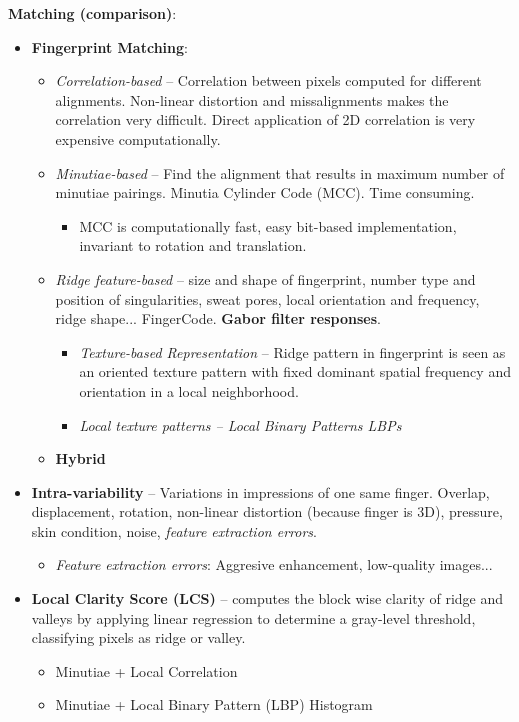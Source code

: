 \documentclass[a4paper]{article}
\begin{document}
      \textbf{Matching (comparison)}:
      \begin{itemize}
        \item \textbf{Fingerprint Matching}:
        \begin{itemize}
          \item \emph{Correlation-based} -- Correlation between pixels computed for different alignments. Non-linear distortion and missalignments makes the correlation very difficult. Direct application of 2D correlation is very expensive computationally.
          \item \emph{Minutiae-based} -- Find the alignment that results in maximum number of minutiae pairings. Minutia Cylinder Code (MCC). Time consuming.
          \begin{itemize}
            \item MCC is computationally fast, easy bit-based implementation, invariant to rotation and translation.
          \end{itemize}
          \item \emph{Ridge feature-based} -- size and shape of fingerprint, number type and position of singularities, sweat pores, local orientation and frequency, ridge shape... FingerCode. \textbf{Gabor filter responses}.
          \begin{itemize}
            \item \emph{Texture-based Representation} -- Ridge pattern in fingerprint is seen as an oriented texture pattern with fixed dominant spatial frequency and orientation in a local neighborhood.
            \item \emph{Local texture patterns -- Local Binary Patterns LBPs}
          \end{itemize}
          \item \textbf{Hybrid}
        \end{itemize}
        \item \textbf{Intra-variability} -- Variations in impressions of one same finger. Overlap, displacement, rotation, non-linear distortion (because finger is 3D), pressure, skin condition, noise, \emph{feature extraction errors}.
        \begin{itemize}
          \item \emph{Feature extraction errors}: Aggresive enhancement, low-quality images...
        \end{itemize}
        \item \textbf{Local Clarity Score (LCS)} -- computes the block wise clarity of ridge and valleys by applying linear regression to determine a gray-level threshold, classifying pixels as ridge or valley.
        \begin{itemize}
          \item Minutiae + Local Correlation
          \item Minutiae + Local Binary Pattern (LBP) Histogram
        \end{itemize}
      \end{itemize}
      \newpage
\end{document}
